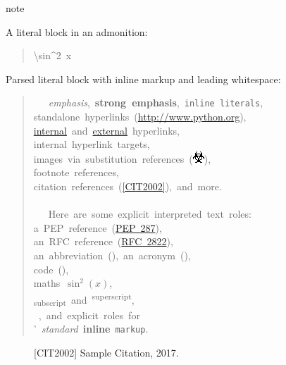\documentclass[a4paper]{article}
\begin{document}
\begin{DUclass}{note}
\begin{DUadmonition}

A literal block in an admonition:

\begin{quote}
\ttfamily\raggedright
\textbackslash{}sin\textasciicircum{}2~x
\end{quote}
\end{DUadmonition}
\end{DUclass}

Parsed literal block with inline markup and leading whitespace:

\begin{quote}
\ttfamily\raggedright
~~~\emph{emphasis},~\textbf{strong~emphasis},~\texttt{inline~literals},\\
standalone~hyperlinks~(\url{http://www.python.org}),\\
\hyperref[internal]{internal}~and~\href{http://www.python.org/}{external}~hyperlinks,\\
%
\label{internal}internal~hyperlink~targets,\\
images~via~substitution~references~(\includegraphics{../../../docs/user/rst/images/biohazard.png}),\\
footnote~references,\\
citation~references~(\hyperlink{cit2002}{[CIT2002]}),~and~more.\\
~\\
~~~Here~are~some~explicit~interpreted~text~roles:\\
a~PEP~reference~(\href{http://www.python.org/dev/peps/pep-0287}{PEP~287}),\\
an~RFC~reference~(\href{http://tools.ietf.org/html/rfc2822.html}{RFC~2822}),\\
an~abbreviation~(),~an~acronym~(),\\
code~(\texttt{}),\\
maths~$\sin^2(x)$,\\
\textsubscript{subscript}~and~\textsuperscript{superscript},\\
~,~and~explicit~roles~for\\
'~\emph{standard}~\textbf{inline}~\texttt{markup}.
\end{quote}
%
\begin{figure}[b][CIT2002]
Sample Citation, 2017.
\end{figure}
\end{document}
